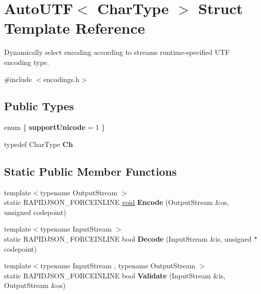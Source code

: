 \hypertarget{struct_auto_u_t_f}{}\section{Auto\+U\+T\+F$<$ Char\+Type $>$ Struct Template Reference}
\label{struct_auto_u_t_f}


Dynamically select encoding according to stream\textquotesingle{}s runtime-\/specified U\+T\+F encoding type.  




{\ttfamily \#include $<$encodings.\+h$>$}

\subsection*{Public Types}
\begin{DoxyCompactItemize}
\item 
\hypertarget{struct_auto_u_t_f_a678e20a7f8d022be68adbb49fa56a094}{}enum \{ {\bfseries support\+Unicode} = 1
 \}\label{struct_auto_u_t_f_a678e20a7f8d022be68adbb49fa56a094}

\item 
\hypertarget{struct_auto_u_t_f_a0609343de776df3bc31b4c980eb3cf1c}{}typedef Char\+Type {\bfseries Ch}\label{struct_auto_u_t_f_a0609343de776df3bc31b4c980eb3cf1c}

\end{DoxyCompactItemize}
\subsection*{Static Public Member Functions}
\begin{DoxyCompactItemize}
\item 
\hypertarget{struct_auto_u_t_f_a414946115261f886e74dd42cb4b98781}{}{\footnotesize template$<$typename Output\+Stream $>$ }\\static R\+A\+P\+I\+D\+J\+S\+O\+N\+\_\+\+F\+O\+R\+C\+E\+I\+N\+L\+I\+N\+E \hyperlink{_s_d_l__audio_8h_a52835ae37c4bb905b903cbaf5d04b05f}{void} {\bfseries Encode} (Output\+Stream \&os, unsigned codepoint)\label{struct_auto_u_t_f_a414946115261f886e74dd42cb4b98781}

\item 
\hypertarget{struct_auto_u_t_f_aa5e3c1dc23dbb75f6442ff69500a35b0}{}{\footnotesize template$<$typename Input\+Stream $>$ }\\static R\+A\+P\+I\+D\+J\+S\+O\+N\+\_\+\+F\+O\+R\+C\+E\+I\+N\+L\+I\+N\+E bool {\bfseries Decode} (Input\+Stream \&is, unsigned $\ast$codepoint)\label{struct_auto_u_t_f_aa5e3c1dc23dbb75f6442ff69500a35b0}

\item 
\hypertarget{struct_auto_u_t_f_a36dd6f226d6a07c12161e21c0aff20b1}{}{\footnotesize template$<$typename Input\+Stream , typename Output\+Stream $>$ }\\static R\+A\+P\+I\+D\+J\+S\+O\+N\+\_\+\+F\+O\+R\+C\+E\+I\+N\+L\+I\+N\+E bool {\bfseries Validate} (Input\+Stream \&is, Output\+Stream \&os)\label{struct_auto_u_t_f_a36dd6f226d6a07c12161e21c0aff20b1}

\end{DoxyCompactItemize}


